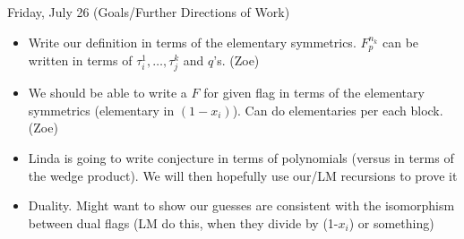 Friday, July 26 (Goals/Further Directions of Work)
\begin{itemize}
    \item Write our definition in terms of the elementary symmetrics. $F_p^{n_k}$ can be written in terms of $\tau_i^1, \ldots, \tau_j^k$ and $q$'s. (Zoe)
    \item We should be able to write a $F$ for given flag in terms of the elementary symmetrics (elementary in $(1-x_i)$). Can do elementaries per each block. (Zoe)
    \item Linda is going to write conjecture in terms of polynomials (versus in terms of the wedge product). We will then hopefully use our/LM recursions to prove it
    \item Duality. Might want to show our guesses are consistent with the isomorphism between dual flags (LM do this, when they divide by (1-$x_i$) or something)
\end{itemize}